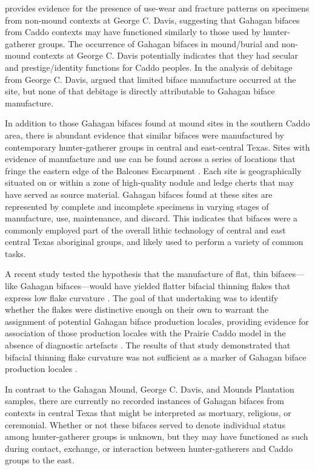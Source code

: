 \documentclass[review]{elsarticle}
\begin{document}
\citet{RN3684} provides evidence for the presence of use-wear and fracture patterns on specimens from non-mound contexts at George C. Davis, suggesting that Gahagan bifaces from Caddo contexts may have functioned similarly to those used by hunter-gatherer groups. The occurrence of Gahagan bifaces in mound/burial and non-mound contexts at George C. Davis potentially indicates that they had secular and prestige/identity functions for Caddo peoples. In the analysis of debitage from George C. Davis, \citet{RN3684} argued that limited biface manufacture occurred at the site, but none of that debitage is directly attributable to Gahagan biface manufacture.

In addition to those Gahagan bifaces found at mound sites in the southern Caddo area, there is abundant evidence that similar bifaces were manufactured by contemporary hunter-gatherer groups in central and east-central Texas. Sites with evidence of manufacture and use can be found across a series of locations that fringe the eastern edge of the Balcones Escarpment \citep[Figure 5-3]{RN11568}. Each site is geographically situated on or within a zone of high-quality nodule and ledge cherts that may have served as source material. Gahagan bifaces found at these sites are represented by complete and incomplete specimens in varying stages of manufacture, use, maintenance, and discard. This indicates that bifaces were a commonly employed part of the overall lithic technology of central and east central Texas aboriginal groups, and likely used to perform a variety of common tasks.

A recent study tested the hypothesis that the manufacture of flat, thin bifaces—like Gahagan bifaces—would have yielded flatter bifacial thinning flakes that express low flake curvature \citep{RN11568}. The goal of that undertaking was to identify whether the flakes were distinctive enough on their own to warrant the assignment of potential Gahagan biface production locales, providing evidence for association of those production locales with the Prairie Caddo model \citep{RN4924} in the absence of diagnostic artefacts \citep{RN11568}. The results of that study demonstrated that bifacial thinning flake curvature was not sufficient as a marker of Gahagan biface production locales \citep{RN11568}.

In contrast to the Gahagan Mound, George C. Davis, and Mounds Plantation samples, there are currently no recorded instances of Gahagan bifaces from contexts in central Texas that might be interpreted as mortuary, religious, or ceremonial. Whether or not these bifaces served to denote individual status among hunter-gatherer groups is unknown, but they may have functioned as such during contact, exchange, or interaction between hunter-gatherers and Caddo groups to the east.
\end{document}
